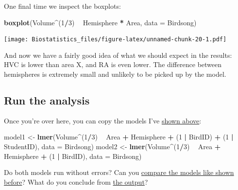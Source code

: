 \documentclass[
]{book}
\newenvironment{Shaded}{\begin{snugshade}}{\end{snugshade}}
\newcommand{\DataTypeTok}[1]{\textcolor[rgb]{0.13,0.29,0.53}{#1}}
\newcommand{\DecValTok}[1]{\textcolor[rgb]{0.00,0.00,0.81}{#1}}
\newcommand{\KeywordTok}[1]{\textcolor[rgb]{0.13,0.29,0.53}{\textbf{#1}}}
\newcommand{\NormalTok}[1]{#1}
\newcommand{\OperatorTok}[1]{\textcolor[rgb]{0.81,0.36,0.00}{\textbf{#1}}}
\newcommand{\OtherTok}[1]{\textcolor[rgb]{0.56,0.35,0.01}{#1}}
\newcommand{\StringTok}[1]{\textcolor[rgb]{0.31,0.60,0.02}{#1}}
\begin{document}
\begin{Shaded}
\end{Shaded}

One final time we inspect the boxplots:

\begin{Shaded}
\begin{Highlighting}[]
\KeywordTok{boxplot}\NormalTok{(Volume}\OperatorTok{^}\NormalTok{(}\DecValTok{1}\OperatorTok{/}\DecValTok{3}\NormalTok{) }\OperatorTok{~}\StringTok{ }\NormalTok{Hemisphere }\OperatorTok{*}\StringTok{ }\NormalTok{Area, }\DataTypeTok{data =}\NormalTok{ Birdsong)}
\end{Highlighting}
\end{Shaded}

\texttt{[image: Biostatistics\_files/figure-latex/unnamed-chunk-20-1.pdf]}

And now we have a fairly good idea of what we should expect in the results: HVC is lower than area X, and RA is even lower. The difference between hemispheres is extremely small and unlikely to be picked up by the model.

\hypertarget{run-the-analysis}{%
\subsection{Run the analysis}\label{run-the-analysis}}

Once you're over here, you can copy the models I've \protect\hyperlink{brainmodel}{shown above}:

\begin{Shaded}
\begin{Highlighting}[]
\NormalTok{model1 <-}\StringTok{ }\KeywordTok{lmer}\NormalTok{(Volume}\OperatorTok{^}\NormalTok{(}\DecValTok{1}\OperatorTok{/}\DecValTok{3}\NormalTok{) }\OperatorTok{~}\StringTok{ }\NormalTok{Area }\OperatorTok{+}\StringTok{ }\NormalTok{Hemisphere }\OperatorTok{+}\StringTok{ }\NormalTok{(}\DecValTok{1} \OperatorTok{|}\StringTok{ }\NormalTok{BirdID) }\OperatorTok{+}\StringTok{ }\NormalTok{(}\DecValTok{1} \OperatorTok{|}\StringTok{ }\NormalTok{StudentID), }
               \DataTypeTok{data =}\NormalTok{ Birdsong)}
\NormalTok{model2 <-}\StringTok{ }\KeywordTok{lmer}\NormalTok{(Volume}\OperatorTok{^}\NormalTok{(}\DecValTok{1}\OperatorTok{/}\DecValTok{3}\NormalTok{) }\OperatorTok{~}\StringTok{ }\NormalTok{Area }\OperatorTok{+}\StringTok{ }\NormalTok{Hemisphere }\OperatorTok{+}\StringTok{ }\NormalTok{(}\DecValTok{1} \OperatorTok{|}\StringTok{ }\NormalTok{BirdID), }
               \DataTypeTok{data =}\NormalTok{ Birdsong)}
\end{Highlighting}
\end{Shaded}

Do both models run without errors? Can you \protect\hyperlink{comparebrain}{compare the models like shown before}? What do you conclude from \protect\hyperlink{brainoutput}{the output}?
\end{document}
